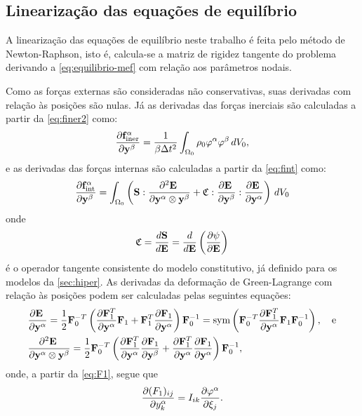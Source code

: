 \documentclass[Tese.tex]{subfiles}
\begin{document}
\subsection{Linearização das equações de equilíbrio}\label{subsec:linearizaca}

A linearização das equações de equilíbrio neste trabalho é feita pelo método de Newton-Raphson, isto é, calcula-se a matriz de rigidez tangente do problema derivando a \cref{eq:equilibrio-mef} com relação aos parâmetros nodais. 

Como as forças externas são consideradas não conservativas, suas derivadas com relação às posições são nulas. Já as derivadas das forças inerciais são calculadas a partir da \cref{eq:finer2} como:
\begin{equation}
\dfrac{\partial \mathbf{f}_\text{iner}^\alpha}{\partial \mathbf{y}^\beta_{\;\;\;}} = \dfrac{1}{\beta\Delta t^2}\int_{\Omega_0}\rho_0\varphi^\alpha\varphi^\beta\,dV_0,
\end{equation}
e as derivadas das forças internas são calculadas a partir da \cref{eq:fint} como:
\begin{equation}\label{eq:fint-lin}
\dfrac{\partial \mathbf{f}_\text{int}^\alpha}{\partial \mathbf{y}^\beta_{\;\;\;}} = \int_{\Omega_0}\left(\mathbf{S}:\dfrac{\partial^2\mathbf{E}_{\;}}{\partial\mathbf{y}^\alpha\otimes\mathbf{y}^\beta} + \mathfrak{C}:\dfrac{\partial\mathbf{E}_{\;}}{\partial\mathbf{y}^\beta}:\dfrac{\partial\mathbf{E}_{\;}}{\partial\mathbf{y}^\alpha}\right)\,dV_0
\end{equation}
onde
\begin{equation}\label{eq:CC}
\mathfrak{C} = \dfrac{d\mathbf{S}}{d\mathbf{E}} = \dfrac{d}{d\mathbf{E}}\left(\dfrac{\partial\psi}{\partial\mathbf{E}}\right)
\end{equation}
é o operador tangente consistente do modelo constitutivo, já definido para os modelos da \autoref{sec:hiper}. As derivadas da deformação de Green-Lagrange com relação às posições podem ser calculadas pelas seguintes equações:
\begin{align}\label{eq:dE-dy}
&\dfrac{\partial\mathbf{E}_{\;}}{\partial\mathbf{y}^\alpha} = \dfrac{1}{2}\mathbf{F}_0^{-T}\left(\dfrac{\partial\mathbf{F}_1^{T}}{\partial\mathbf{y}^\alpha}\mathbf{F}_1 + \mathbf{F}_1^{T}\dfrac{\partial\mathbf{F}_1}{\partial\mathbf{y}^\alpha}\right)\mathbf{F}_0^{-1} = \text{sym}\left(\mathbf{F}_0^{-T}\dfrac{\partial\mathbf{F}_1^{T}}{\partial\mathbf{y}^\alpha}\mathbf{F}_1\mathbf{F}_0^{-1}\right), \text{\quad e} \\
&\dfrac{\partial^2\mathbf{E}_{\;}}{\partial\mathbf{y}^\alpha\otimes\mathbf{y}^\beta} = \dfrac{1}{2}\mathbf{F}_0^{-T}\left(\dfrac{\partial\mathbf{F}_1^{T}}{\partial\mathbf{y}^\alpha}\dfrac{\partial\mathbf{F}_1}{\partial\mathbf{y}^\beta} + \dfrac{\partial\mathbf{F}_1^T}{\partial\mathbf{y}^\alpha}\dfrac{\partial\mathbf{F}_1}{\partial\mathbf{y}^\alpha}\right)\mathbf{F}_0^{-1},
\end{align}
onde, a partir da \cref{eq:F1}, segue que
\begin{equation}\label{eq:dF1-dy}
\dfrac{\partial(F_1)_{ij}}{\partial y^\alpha_{k}} = I_{ik} \dfrac{\partial\varphi^\alpha}{\partial{\xi}_{j}}.
\end{equation}
\end{document}
